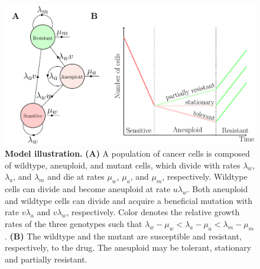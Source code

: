 \documentclass[12pt]{extarticle}
\begin{document}
\begin{figure}
\centering
\includegraphics[width=\textwidth]{Figures/figureAneuploidy.pdf}
\caption{
\textbf{Model illustration.}
\textbf{(A)} A population of cancer cells is composed of wildtype, aneuploid, and mutant cells, which divide with rates $\lambda_w$, $\lambda_a$, and $\lambda_m$ and die at rates $\mu_w$, $\mu_a$, and $\mu_m$, respectively. 
Wildtype cells can divide and become aneuploid at rate $u\lambda_w$. Both aneuploid and wildtype cells can divide and acquire a beneficial mutation with rate $v\lambda_a$ and $v\lambda_w$, respectively. Color denotes the relative growth rates of the three genotypes such that $\lambda_w - \mu_w < \lambda_a - \mu_a < \lambda_m - \mu_m$. \textbf{(B)} The wildtype and the mutant are susceptible and resistant, respectively, to the drug. The aneuploid may be tolerant, stationary and partially resistant.
}
\label{figureAneuploidy}
\end{figure}
\end{document}
